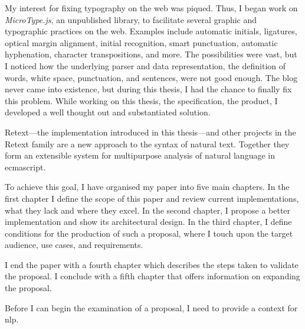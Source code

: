My interest for fixing typography on the web was piqued.
Thus, I began work on \emph{MicroType.js}, an unpublished library, to
  facilitate several graphic and typographic practices on the web.
Examples include automatic initials, ligatures, optical margin alignment,
  initial recognition, smart punctuation, automatic hyphenation, character
  transpositions, and more.
The possibilities were vast, but I noticed how the underlying parser and data
  representation, the definition of words, white space, punctuation, and
  sentences, were not good enough.
The blog never came into existence, but during this thesis, I had the chance
  to finally fix this problem.
While working on this thesis, the specification, the product, I developed a
  well thought out and substantiated solution.

Retext---the implementation introduced in this thesis---and other projects
in the Retext family are a new approach to the syntax of natural text.
Together they form an extensible system for multipurpose analysis of natural
language in \gls{ecmascript}.

To achieve this goal, I have organised my paper into five main chapters. In
the first chapter I define the scope of this paper and review current
implementations, what they lack and where they excel. In the second
chapter, I propose a better implementation and show its architectural
design. In the third chapter, I define conditions for the production of
such a proposal, where I touch upon the target audience, use cases, and
requirements.

I end the paper with a fourth chapter which describes the steps taken to
validate the proposal. I conclude with a fifth chapter that offers
information on expanding the proposal.

Before I can begin the examination of a proposal, I need to provide a
context for \gls{nlp}.

\endgroup
